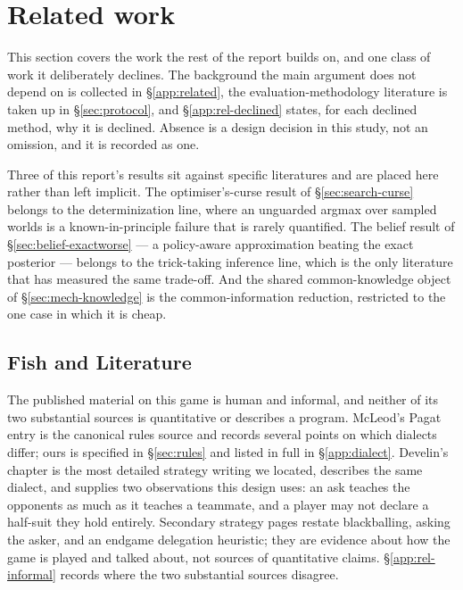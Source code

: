 \section{Related work}
\label{sec:related}

This section covers the work the rest of the report builds on, and one class of
work it deliberately declines. The background the main argument does not depend
on is collected in \S\ref{app:related}, the evaluation-methodology literature is
taken up in \S\ref{sec:protocol}, and \S\ref{app:rel-declined} states, for each
declined method, why it is declined. Absence is a design decision in this study,
not an omission, and it is recorded as one.

Three of this report's results sit against specific literatures and are placed
here rather than left implicit. The optimiser's-curse result of
\S\ref{sec:search-curse} belongs to the determinization line, where an unguarded
argmax over sampled worlds is a known-in-principle failure that is rarely
quantified. The belief result of \S\ref{sec:belief-exactworse} --- a
policy-aware approximation beating the exact posterior --- belongs to the
trick-taking inference line, which is the only literature that has measured the
same trade-off. And the shared common-knowledge object of
\S\ref{sec:mech-knowledge} is the common-information reduction, restricted to
the one case in which it is cheap.

\subsection{Fish and Literature}
\label{sec:related-fish}

The published material on this game is human and informal, and neither of its
two substantial sources is quantitative or describes a program. McLeod's Pagat
entry \cite{pagat} is the canonical rules source and records several points on
which dialects differ; ours is specified in \S\ref{sec:rules} and listed in full
in \S\ref{app:dialect}. Develin's chapter \cite{develin} is the most detailed
strategy writing we located, describes the same dialect, and supplies two
observations this design uses: an ask teaches the opponents as much as it
teaches a teammate, and a player may not declare a half-suit they hold entirely.
Secondary strategy pages \cite{dorsa,strategy-site,wikiliterature} restate
blackballing, asking the asker, and an endgame delegation heuristic; they are
evidence about how the game is played and talked about, not sources of
quantitative claims. \S\ref{app:rel-informal} records where the two substantial
sources disagree.

